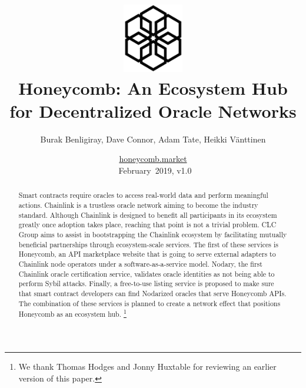 \documentclass[12pt]{article}
\begin{document}
\title{\vspace{-2cm} \includegraphics[height=3cm]{Figures/honeycomb_solo} \\\vspace{2cm} \textbf{\Large Honeycomb: An Ecosystem Hub \\ for Decentralized Oracle Networks}}
	
\author{Burak Benligiray, Dave Connor, Adam Tate, Heikki Vänttinen}

\date{\href{https://honeycomb.market}{honeycomb.market}\\ ~February~2019, v1.0}
	
\maketitle

\begin{abstract}
Smart contracts require oracles to access real-world data and perform meaningful actions.
Chainlink is a trustless oracle network aiming to become the industry standard.
Although Chainlink is designed to benefit all participants in its ecosystem greatly once adoption takes place, reaching that point is not a trivial problem.
CLC Group aims to assist in bootstrapping the Chainlink ecosystem by facilitating mutually beneficial partnerships through ecosystem-scale services.
The first of these services is Honeycomb, an API marketplace website that is going to serve external adapters to Chainlink node operators under a software-as-a-service model.
Nodary, the first Chainlink oracle certification service, validates oracle identities as not being able to perform Sybil attacks.
Finally, a free-to-use listing service is proposed to make sure that smart contract developers can find Nodarized oracles that serve Honeycomb APIs.
The combination of these services is planned to create a network effect that positions Honeycomb as an ecosystem hub.
{\let\thefootnote\relax\footnote{{We thank Thomas Hodges and Jonny Huxtable for reviewing an earlier version of this paper.}}}
\end{abstract}

\newpage
{}
\setcounter{page}{1}
\end{document}
